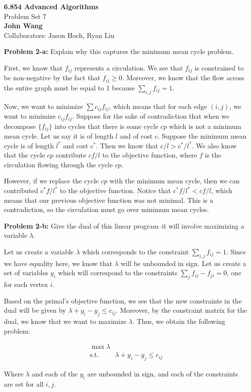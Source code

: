 \documentclass[psamsfonts]{amsart}
\newenvironment{sol}{\vspace{0.25cm}{\large \bfseries Solution:}}{\qedsymbol}
\newenvironment{prob}[1]{\begin{framed}{\large \bfseries Problem #1:}}{\end{framed}}
\newcommand{\makenewtitle}{
    \begin{center}
    {\huge \bfseries 6.854 Advanced Algorithms} \\
    Problem Set 7\\
    \vspace{0.25cm}
    {\bfseries John Wang} \\
    Collaborators: Jason Hoch, Ryan Liu 
    \end{center}
    \vspace{0.5cm}
}
\begin{document}
\newpage
\makenewtitle

\begin{prob}{2-a}
Explain why this captures the minimum mean cycle problem.
\end{prob}
\begin{sol}
First, we know that $f_{ij}$ represents a circulation. We see that $f_{ij}$ is constrained to be non-negative by the fact that $f_{ij} \geq 0$. Moreover, we know that the flow across the entire graph must be equal to 1 because $\sum_{i,j} f_{ij} = 1$. 

Now, we want to minimize $\sum c_{ij} f_{ij}$, which means that for each edge $(i,j)$, we want to minimize $c_{ij} f_{ij}$. Suppose for the sake of contradiction that when we decompose $\{ f_{ij} \}$ into cycles that there is some cycle $cp$ which is not a minimum mean cycle. Let us say it is of length $l$ and of cost $c$. Suppose the minimum mean cycle is of length $l^*$ and cost $c^*$. Then we know that $c/l > c^*/l^*$. We also know that the cycle $cp$ contribute $c f / l$ to the objective function, where $f$ is the circulation flowing through the cycle $cp$. 

However, if we replace the cycle $cp$ with the minimum mean cycle, then we can contributed $c^* f / l^*$ to the objective function. Notice that $c^* f / l^* < c f/l $, which means that our previous objective function was not minimal. This is a contradiction, so the circulation must go over minimum mean cycles.  
\end{sol}

\begin{prob}{2-b}
Give the dual of this linear program--it will involve maximizing a variable $\lambda$.
\end{prob}
\begin{sol}
Let us create a variable $\lambda$ which corresponds to the constraint $\sum_{i,j} f_{ij} = 1$. Since we have equality here, we know that $\lambda$ will be unbounded in sign. Let us create a set of variables $y_{i}$ which will correspond to the constraints $\sum_{j} f_{ij} - f_{ji} = 0$, one for each vertex $i$. 

Based on the primal's objective function, we see that the new constraints in the dual will be given by $\lambda + y_i - y_j \leq c_{ij}$. Moreover, by the constraint matrix for the dual, we know that we want to maximize $\lambda$. Thus, we obtain the following problem:

\begin{eqnarray}
\max \lambda \\
\text{s.t.} \hspace{1cm} \lambda + y_i - y_j \leq c_{ij}
\end{eqnarray}

Where $\lambda$ and each of the $y_i$ are unbounded in sign, and each of the constraints are set for all $i,j$. 
\end{sol}
\end{document}

